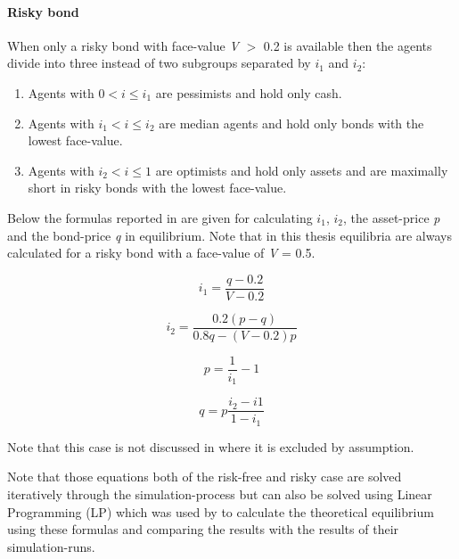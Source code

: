 \documentclass[../Bachelorarbeit.tex]{subfiles}
\begin{document}
\paragraph{Risky bond}
When only a risky bond with face-value \textit{V} $>$ 0.2 is available then the agents divide into three instead of two subgroups separated by $i_{1}$ and $i_{2}$:

\begin{enumerate}
\item Agents with $0 < i \leq i_{1}$ are pessimists and hold only cash.
\item Agents with $i_{1} < i \leq i_{2}$ are median agents and hold only bonds with the lowest face-value.
\item Agents with $i_{2} < i \leq 1$ are optimists and hold only assets and are maximally short in risky bonds with the lowest face-value.
\end{enumerate} 

Below the formulas reported in \cite{Breuer2015} are given for calculating $i_{1}$, $i_{2}$, the asset-price \textit{p} and the bond-price \textit{q} in equilibrium. Note that in this thesis equilibria are always calculated for a risky bond with a face-value of \textit{V} = 0.5.

\begin{equation}
i_{1} = \frac{q - 0.2}{V - 0.2}
\end{equation}

\begin{equation}
i_{2} = \frac{0.2(p - q)}{0.8q - (V - 0.2)p}
\end{equation}

\begin{equation}
p = \frac{1}{i_{1}} - 1
\end{equation}

\begin{equation}
q = p \frac{i_{2} - i{1}}{1 - i_{1}}
\end{equation}

Note that this case is not discussed in \cite{Geanakoplos2009} where it is excluded by assumption.

\medskip

Note that those equations both of the risk-free and risky case are solved iteratively through the simulation-process but can also be solved using Linear Programming (LP) which was used by \cite{Breuer2015} to calculate the theoretical equilibrium using these formulas and comparing the results with the results of their simulation-runs.
\end{document}

